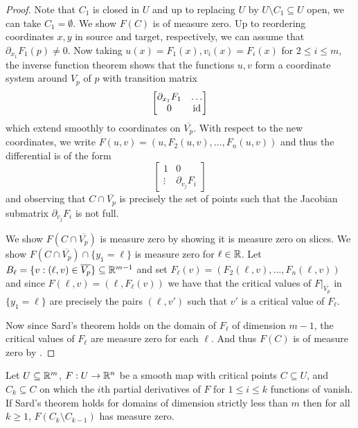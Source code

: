 \begin{proof}
    Note that $C_{1}$ is closed in $U$ and up to replacing $U$ by $U\setminus C_{1}\subseteq U$ open, we can take $C_{1}=\emptyset$. We show $F(C)$ is of measure zero. Up to reordering coordinates $x,y$ in source and target, respectively, we can assume that $\partial_{x_{1}}F_{1}(p)\neq0$. Now taking $u(x)=F_{1}(x), v_{i}(x)=F_{i}(x)$ for $2\leq i\leq m$, the inverse function theorem shows that the functions $u,v$ form a coordinate system around $V_{p}$ of $p$ with transition matrix 
    $$\begin{bmatrix}
        \partial_{x_{1}}F_{1} & \dots \\
        0 & \mathrm{id}
    \end{bmatrix}$$ 
    which extend smoothly to coordinates on $\overline{V_{p}}$. With respect to the new coordinates, we write $F(u,v)=(u,F_{2}(u,v),\dots,F_{n}(u,v))$ and thus the differential is of the form 
    $$\begin{bmatrix}
        1 & 0 \\ \vdots & \partial_{v_{j}}F_{i}
    \end{bmatrix}$$
    and observing that $C\cap\overline{V_{p}}$ is precisely the set of points such that the Jacobian submatrix $\partial_{v_{j}}F_{i}$ is not full. 

    We show $F(C\cap \overline{V_{p}})$ is measure zero by showing it is measure zero on slices. We show $F(C\cap \overline{V_{p}})\cap\{y_{1}=\ell\}$ is measure zero for $\ell\in\mathbb{R}$. Let $B_{\ell}=\{v:(\ell,v)\in\overline{V_{p}}\}\subseteq\mathbb{R}^{m-1}$ and set $F_{\ell}(v)=(F_{2}(\ell,v),\dots,F_{n}(\ell,v))$ and since $F(\ell,v)=(\ell,F_{\ell}(v))$ we have that the critical values of $F|_{\overline{V_{p}}}$ in $\{y_{1}=\ell\}$ are precisely the pairs $(\ell,v')$ such that $v'$ is a critical value of $F_{\ell}$. 

    Now since Sard's theorem holds on the domain of $F_{\ell}$ of dimension $m-1$, the critical values of $F_{\ell}$ are measure zero for each $\ell$. And thus $F(C)$ is of measure zero by . 
\end{proof}
\begin{lemma}\label{lem: Ck minus Ck plus one is measure zero}
    Let $U\subseteq\mathbb{R}^{m}$, $F:U\to\mathbb{R}^{n}$ be a smooth map with critical points $C\subseteq U$, and $C_{k}\subseteq C$ on which the $i$th partial derivatives of $F$ for $1\leq i\leq k$ functions of vanish. If Sard's theorem holds for domains of dimension strictly less than $m$ then for all $k\geq 1$, $F(C_{k}\setminus C_{k-1})$ has measure zero. 
\end{lemma}
